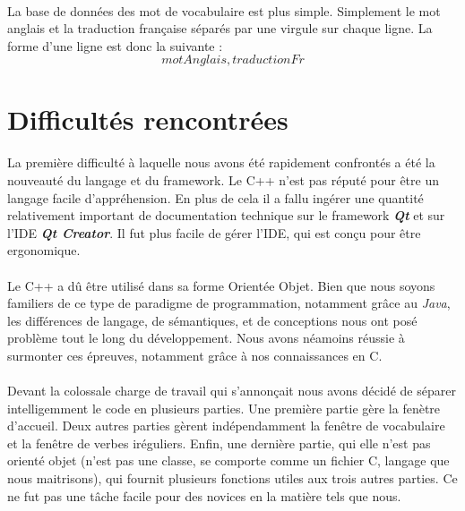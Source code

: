 \documentclass[12pt, a4paper]{report}
\begin{document}
\paragraph{}La base de données des mot de vocabulaire est plus simple. Simplement le mot anglais et la traduction française séparés par une virgule sur chaque ligne. La forme d'une ligne est donc la suivante :
\[motAnglais,traductionFr\]

\newpage
\section*{\hspace{0.6cm}Difficultés rencontrées}

\paragraph{}La première difficulté à laquelle nous avons été rapidement confrontés a été la nouveauté du langage et du framework. Le C++ n'est pas réputé pour être un langage facile d'appréhension. En plus de cela il a fallu ingérer une quantité relativement important de documentation technique sur le framework \textbf{\textit{Qt}} et sur l'IDE \textbf{\textit{Qt Creator}}. Il fut plus facile de gérer l'IDE, qui est conçu pour être ergonomique.

\paragraph{}Le C++ a dû être utilisé dans sa forme Orientée Objet. Bien que nous soyons familiers de ce type de paradigme de programmation, notamment grâce au \textit{Java}, les différences de langage, de sémantiques, et de conceptions nous ont posé problème tout le long du développement. Nous avons néamoins réussie à surmonter ces épreuves, notamment grâce à nos connaissances en C.

\paragraph{}Devant la colossale charge de travail qui s'annonçait nous avons décidé de séparer intelligemment le code en plusieurs parties. Une première partie gère la fenètre d'accueil. Deux autres parties gèrent indépendamment la fenêtre de vocabulaire et la fenêtre de verbes iréguliers. Enfin, une dernière partie, qui elle n'est pas orienté objet (n'est pas une classe, se comporte comme un fichier C, langage que nous maitrisons), qui fournit plusieurs fonctions utiles aux trois autres parties. Ce ne fut pas une tâche facile pour des novices en la matière tels que nous.
\end{document}
